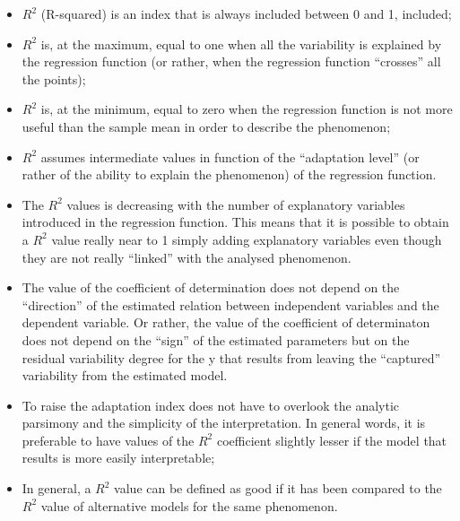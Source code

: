 \begin{frame}
  \vspace*{.25cm}
  \begin{small}
    \begin{itemize}
      \item $ R^{2} $ (R-squared) is an index that is always included between 0 and 1, included;
      \item $ R^{2} $ is, at the maximum, equal to one when all the variability is explained by the regression function (or rather, when the regression function ``crosses'' all the points);
      \item $ R^{2} $ is, at the minimum, equal to zero when the regression function is not more useful than the sample mean in order to describe the phenomenon;
      \item $ R^{2} $ assumes intermediate values in function of the ``adaptation level'' (or rather of the ability to explain the phenomenon) of the regression function.
      \item The $ R^{2} $  values is decreasing with the number of explanatory variables introduced in the regression function. This means that it is possible to obtain a $R^{2}$ value really near to 1 simply adding explanatory variables even though they are not really ``linked'' with the analysed phenomenon.
    \end{itemize}
  \end{small}
\end{frame}

\begin{frame}
  \begin{itemize}
    \item The value of the coefficient of determination does not depend on the ``direction'' of the estimated relation between independent variables and the dependent variable. Or rather, the value of the coefficient of determinaton does not depend on the ``sign'' of the estimated parameters but on the residual variability degree for the y that results from leaving the ``captured'' variability from the estimated model.
    \item To raise the adaptation index does not have to overlook the analytic parsimony and the simplicity of the interpretation. In general words, it is preferable to have values of the $R^{2}$ coefficient slightly lesser if the model that results is more easily interpretable;
    \item In general, a $ R^{2} $ value can be defined as good if it has been compared to the $ R^{2} $ value of alternative models for the same phenomenon.
  \end{itemize}
\end{frame}


